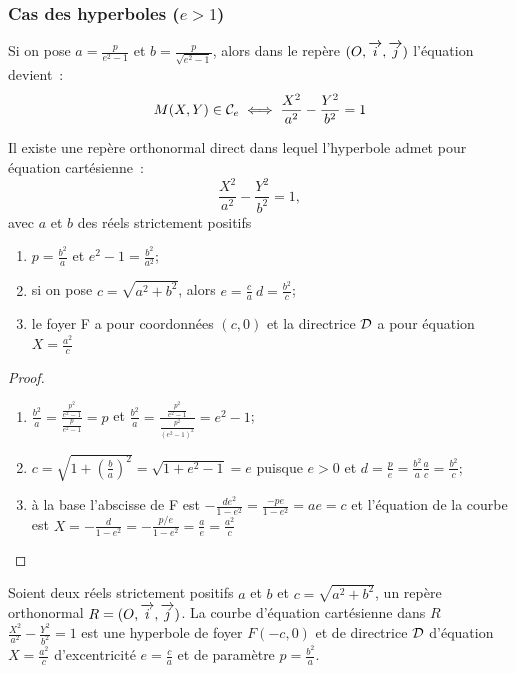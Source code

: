 \subsubsection{Cas des hyperboles ($e>1$)}
Si on pose $a=\frac{p}{e^2-1}$ et $b=\frac{p}{\sqrt{e^2-1}}$, alors dans le repère $(O,\overrightarrow{i},\overrightarrow{j})$ l'équation devient~:
\begin{equation}
  M(X,Y) \in \mathcal{C}_{e} \iff \frac{X^2}{a^2}-\frac{Y^2}{b^2}=1
\end{equation}
\begin{theo}
  Il existe une repère orthonormal direct dans lequel l'hyperbole admet pour équation cartésienne~:
  \begin{equation}
    \frac{X^2}{a^2}-\frac{Y^2}{b^2}=1,
  \end{equation}
avec $a$ et $b$ des réels strictement positifs
\end{theo}
\begin{prop}
  \begin{enumerate}
  \item $p=\frac{b^2}{a}$ et $e^2-1=\frac{b^2}{a^2}$;
  \item si on pose $c=\sqrt{a^2+b^2}$, alors $e=\frac{c}{a} \ d=\frac{b^2}{c}$;
  \item le foyer F a pour coordonnées $(c,0)$ et la directrice $\mathcal{D}$ a pour équation $X=\frac{a^2}{c}$
  \end{enumerate}
\end{prop}
\begin{proof}
  \begin{enumerate}
  \item $\frac{b^2}{a}=\frac{\frac{p^2}{e^2-1}}{\frac{p}{e^2-1}}=p$ et $\frac{b^2}{a}=\frac{\frac{p^2}{e^2-1}}{\frac{p^2}{(e^2-1)^2}}=e^2-1$;
  \item $c=\sqrt{1+\left(\frac{b}{a}\right)^2}=\sqrt{1+e^2-1}=e$ puisque $e>0$ et $d=\frac{p}{e}=\frac{b^2}{a} \frac{a}{c}=\frac{b^2}{c}$;
  \item à la base l'abscisse de F est $-\frac{de^2}{1-e^2}=\frac{-pe}{1-e^2}=ae=c$ et l'équation de la courbe est $X=-\frac{d}{1-e^2}=-\frac{p/e}{1-e^2}=\frac{a}{e}=\frac{a^2}{c}$
  \end{enumerate}
\end{proof}
\begin{theo}
  Soient deux réels strictement positifs $a$ et $b$ et $c=\sqrt{a^2+b^2}$, un repère orthonormal $R=(O,\overrightarrow{i},\overrightarrow{j})$. La courbe d'équation cartésienne dans $R$ $\frac{X^2}{a^2}-\frac{Y^2}{b^2}=1$ est une hyperbole de foyer $F(-c,0)$ et de directrice $\mathcal{D}$ d'équation $X=\frac{a^2}{c}$ d'excentricité $e=\frac{c}{a}$ et de paramètre $p=\frac{b^2}{a}$.
\end{theo}
